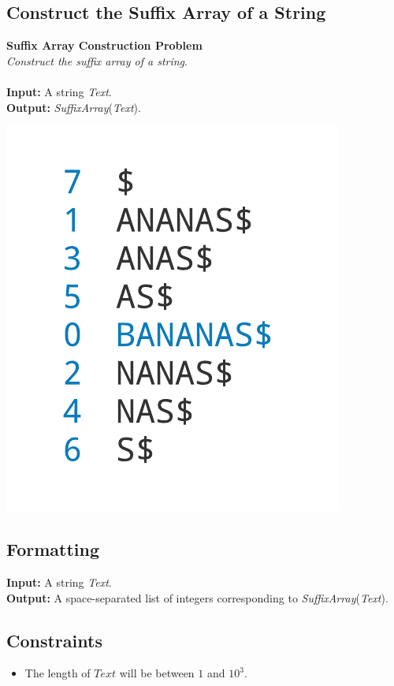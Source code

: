 \documentclass{article}
\begin{document}
\subsection{Construct the Suffix Array of a String}
\hline\vspace{5}
\textbf{Suffix Array Construction Problem}\\
\emph{Construct the suffix array of a string}.\\ \\
\textbf{Input:} A string \emph{Text}.\\
\textbf{Output:} \emph{SuffixArray}(\emph{Text}).
\begin{center}
    \includegraphics[scale=0.2]{logos/9G.png} 
\end{center}
\hline\vspace{5}

\subsection*{Formatting}
\textbf{Input:} A string \emph{Text}.\\
\noindent \textbf{Output:} A space-separated list of integers corresponding to \emph{SuffixArray}(\emph{Text}).

\subsection*{Constraints}
\begin{itemize}
    \item The length of $Text$ will be between $1$ and $10^3$.
\end{itemize}
\end{document}

